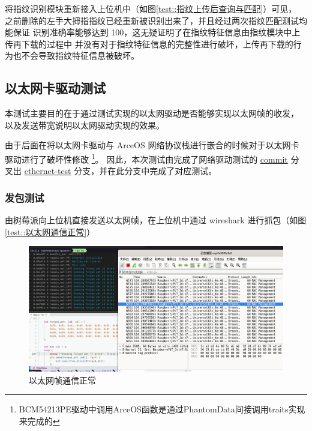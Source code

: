     将指纹识别模块重新接入上位机中（如图\ref{test::指纹上传后查询与匹配}）可见，
    之前删除的左手大拇指指纹已经重新被识别出来了，并且经过两次指纹匹配测试均能保证
    识别准确率能够达到 100，这无疑证明了在指纹特征信息由指纹模块中上传再下载的过程中
    并没有对于指纹特征信息的完整性进行破坏，上传再下载的行为也不会导致指纹特征信息被破坏。

    \subsection{以太网卡驱动测试}

    本测试主要目的在于通过测试实现的以太网驱动是否能够实现以太网帧的收发，
    以及发送带宽说明以太网驱动实现的效果。

    由于后面在将以太网卡驱动与 ArceOS 网络协议栈进行嵌合的时候对于以太网卡驱动进行了破坏性修改
    \footnote{BCM54213PE驱动中调用ArceOS函数是通过PhantomData间接调用traits实现来完成的}。
    因此，本次测试由完成了网络驱动测试的 \href{https://bitbucket.org/jackyliu16/arceos/commits/92e9b6abcdf180359381088552688c0fcbc83bf2}{commit} 
    分叉出 \href{https://bitbucket.org/jackyliu16/arceos/commits/branch/ethernet-test}{ethernet-test}
    分支，并在此分支中完成了对应测试。

    \subsubsection{发包测试}

    由树莓派向上位机直接发送以太网帧，在上位机中通过 wireshark 进行抓包（如图\ref{test::以太网通信正常}）

    \begin{figure}[ht]
        \centering
        \caption{以太网帧通信正常}    \label{test::以太网帧发送}
        \includegraphics[width=\textwidth]{./imgs/以太网帧通信正常.jpg}
    \end{figure}   

